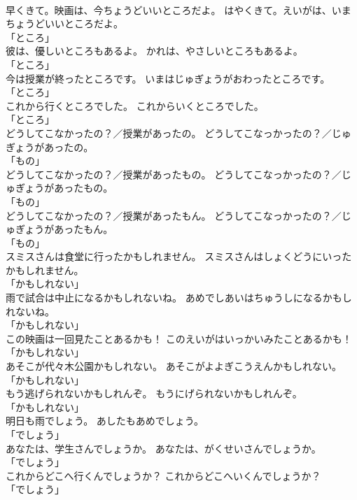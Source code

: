 \documentclass[8pt]{extreport}
\begin{document}
\begin{CJK}{UTF8}{min}
\\	早くきて。映画は、今ちょうどいいところだよ。	はやくきて。えいがは、いまちょうどいいところだよ。	
\\	「ところ」 
\\	彼は、優しいところもあるよ。	かれは、やさしいところもあるよ。	
\\	「ところ」 
\\	今は授業が終ったところです。	いまはじゅぎょうがおわったところです。	
\\	「ところ」 
\\	これから行くところでした。	これからいくところでした。	
\\	「ところ」 
\\	どうしてこなかったの？／授業があったの。	どうしてこなっかったの？／じゅぎょうがあったの。	
\\	「もの」 
\\	どうしてこなかったの？／授業があったもの。	どうしてこなっかったの？／じゅぎょうがあったもの。	
\\	「もの」 
\\	どうしてこなかったの？／授業があったもん。	どうしてこなっかったの？／じゅぎょうがあったもん。	
\\	「もの」 
\\	スミスさんは食堂に行ったかもしれません。	スミスさんはしょくどうにいったかもしれません。	
\\	「かもしれない」 
\\	雨で試合は中止になるかもしれないね。	あめでしあいはちゅうしになるかもしれないね。	
\\	「かもしれない」 
\\	この映画は一回見たことあるかも！	このえいがはいっかいみたことあるかも！	
\\	「かもしれない」 
\\	あそこが代々木公園かもしれない。	あそこがよよぎこうえんかもしれない。	
\\	「かもしれない」 
\\	もう逃げられないかもしれんぞ。	もうにげられないかもしれんぞ。	
\\	「かもしれない」 
\\	明日も雨でしょう。	あしたもあめでしょう。	
\\	「でしょう」 
\\	あなたは、学生さんでしょうか。	あなたは、がくせいさんでしょうか。	
\\	「でしょう」 
\\	これからどこへ行くんでしょうか？	これからどこへいくんでしょうか？	
\\	「でしょう」 

\end{CJK}
\end{document}

